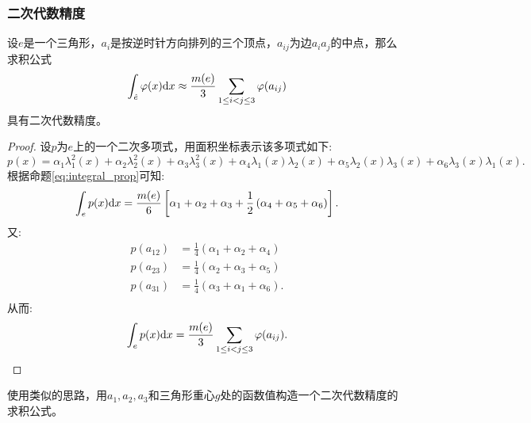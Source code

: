 \subsubsection{二次代数精度}
\begin{proposition}
    设$e$是一个三角形，$a_{i}$是按逆时针方向排列的三个顶点，$a_{ij}$为边$a_{i}a_{j}$的中点，那么求积公式
    \begin{equation}
        \int_{\hat{e}}\varphi(x)\mathrm{d} x\approx\frac{m(e)}{3}\sum_{1\le i<j\le 3}\varphi(a_{ij})
    \end{equation}
    具有二次代数精度。
\end{proposition}
\begin{proof}
    设$p$为$e$上的一个二次多项式，用面积坐标表示该多项式如下:
    \begin{equation}
        p(x)=\alpha_{1}\lambda_{1}^{2}(x)+\alpha_{2}\lambda_{2}^{2}(x)+\alpha_{3}\lambda_{3}^{2}(x)+\alpha_{4}\lambda_{1}(x)\lambda_{2}(x)+\alpha_{5}\lambda_{2}(x)\lambda_{3}(x)+\alpha_{6}\lambda_{3}(x)\lambda_{1}(x).
    \end{equation}
    根据命题\ref{eq:integral_prop}可知:
    \begin{equation}
        \int_{e}p(x)\mathrm{d} x=\frac{m(e)}{6}\left[\alpha_{1}+\alpha_{2}+\alpha_{3}+\frac{1}{2}\left(\alpha_{4}+\alpha_{5}+\alpha_{6}\right)\right].
    \end{equation}
    又:
    \begin{equation}
        \begin{aligned}
            p(a_{12})&=\frac{1}{4}(\alpha_{1}+\alpha_{2}+\alpha_{4})\\
            p(a_{23})&=\frac{1}{4}(\alpha_{2}+\alpha_{3}+\alpha_{5})\\
            p(a_{31})&=\frac{1}{4}(\alpha_{3}+\alpha_{1}+\alpha_{6}).\\
        \end{aligned}
    \end{equation}
    从而:
    \begin{equation}
        \int_{e}p(x)\mathrm{d} x=\frac{m(e)}{3}\sum_{1\le i<j\le 3}\varphi(a_{ij}).
    \end{equation}
\end{proof}
\begin{exercise}
    使用类似的思路，用$a_{1},a_{2},a_{3}$和三角形重心$g$处的函数值构造一个二次代数精度的求积公式。
\end{exercise}
